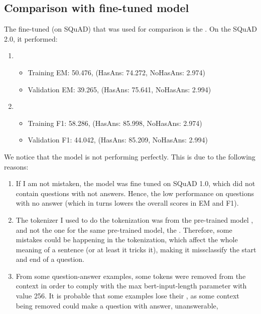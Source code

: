 \documentclass[12pt]{report}
\begin{document}
\subsection*{Comparison with fine-tuned model}
The fine-tuned (on SQuAD) that was used for comparison is the
. On the SQuAD 2.0, it
performed:
\begin{enumerate}
    \item \begin{itemize}
            \item Training EM: 50.476, (HasAns: 74.272, NoHasAns: 2.974)
            \item Validation EM: 39.265, (HasAns: 75.641, NoHasAns: 2.994)
          \end{itemize}
    \item \begin{itemize}
            \item Training F1: 58.286, (HasAns: 85.998, NoHasAns: 2.974)
            \item Validation F1: 44.042, (HasAns: 85.209, NoHasAns: 2.994)
          \end{itemize}
\end{enumerate}
We notice that the model is not performing perfectly. This is due to the following
reasons:
\begin{enumerate}
    \item If I am not mistaken, the model was fine tuned on SQuAD 1.0, which did not
        contain questions with not answers. Hence, the low performance on questions
        with no answer (which in turns lowers the overall scores in EM and F1).
    \item The tokenizer I used to do the tokenization was from the pre-trained model
        , and not the one for the same pre-trained model,
        the .
        Therefore, some mistakes could be happening in the tokenization, which affect
        the whole meaning of a sentence (or at least it tricks it), making it
        missclassify the start and end of a question.
    \item From some question-answer examples, some tokens were removed from the context
        in order to comply with the max bert-input-length parameter with value 256.
        It is probable that some examples lose their , as some
        context being removed could make a question with answer, unanswerable, 
\end{enumerate}
\end{document}
